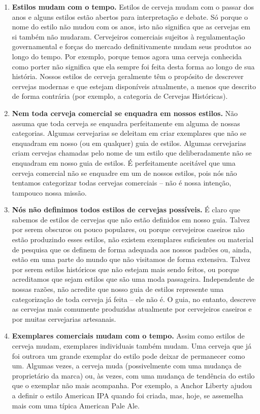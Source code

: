 \begin{enumerate}
\item \textbf{Estilos mudam com o tempo.} Estilos de cerveja mudam com o passar dos anos e alguns estilos estão abertos para interpretação e debate. Só porque o nome do estilo não mudou com os anos, isto não significa que as cervejas em si também não mudaram. Cervejeiros comerciais sujeitos à regulamentação governamental e forças do mercado definitivamente mudam seus produtos ao longo do tempo. Por exemplo, porque temos agora uma cerveja conhecida como porter não significa que ela sempre foi feita desta forma ao longo de sua história. Nossos estilos de cerveja geralmente têm o propósito de descrever cervejas modernas e que estejam disponíveis atualmente, a menos que descrito de forma contrária (por exemplo, a categoria de Cervejas Históricas).
\item \textbf{Nem toda cerveja comercial se enquadra em nossos estilos.} Não assuma que toda cerveja se enquadra perfeitamente em alguma de nossas categorias. Algumas cervejarias se deleitam em criar exemplares que não se enquadram em nosso (ou em qualquer) guia de estilos. Algumas cervejarias criam cervejas chamadas pelo nome de um estilo que deliberadamente não se enquadram em nosso guia de estilos. É perfeitamente aceitável que uma cerveja comercial não se enquadre em um de nossos estilos, pois nós não tentamos categorizar todas cervejas comerciais – não é nossa intenção, tampouco nossa missão.
\item \textbf{Nós não definimos todos estilos de cervejas possíveis.} É claro que sabemos de estilos de cervejas que não estão definidos em nosso guia. Talvez por serem obscuros ou pouco populares, ou porque cervejeiros caseiros não estão produzindo esses estilos, não existem exemplares suficientes ou material de pesquisa que os definem de forma adequada aos nossos padrões ou, ainda, estão em uma parte do mundo que não visitamos de forma extensiva. Talvez por serem estilos históricos que não estejam mais sendo feitos, ou porque acreditamos que sejam estilos que são uma moda passageira. Independente de nossas razões, não acredite que nosso guia de estilos represente uma categorização de toda cerveja já feita – ele não é. O guia, no entanto, descreve as cervejas mais comumente produzidas atualmente por cervejeiros caseiros e por muitas cervejarias artesanais.
\item \textbf{Exemplares comerciais mudam com o tempo.} Assim como estilos de cerveja mudam, exemplares individuais também mudam. Uma cerveja que já foi outrora um grande exemplar do estilo pode deixar de permanecer como um. Algumas vezes, a cerveja muda (possivelmente com uma mudança de proprietário da marca) ou, às vezes, com uma mudança de tendência do estilo que o exemplar não mais acompanha. Por exemplo, a Anchor Liberty ajudou a definir o estilo American IPA quando foi criada, mas, hoje, se assemelha mais com uma típica American Pale Ale.

\end{enumerate}
